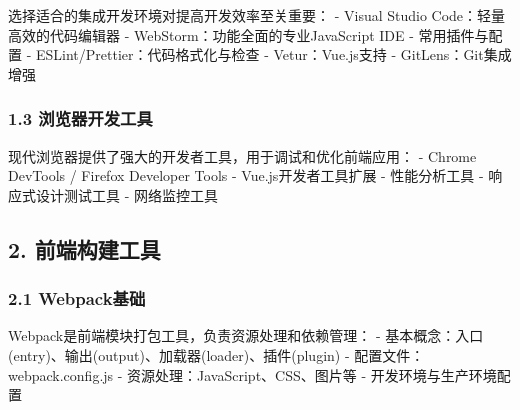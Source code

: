 选择适合的集成开发环境对提高开发效率至关重要： - Visual Studio
Code：轻量高效的代码编辑器 - WebStorm：功能全面的专业JavaScript IDE -
常用插件与配置 - ESLint/Prettier：代码格式化与检查 - Vetur：Vue.js支持 -
GitLens：Git集成增强

\subsubsection{1.3
浏览器开发工具}\label{ux6d4fux89c8ux5668ux5f00ux53d1ux5de5ux5177}

现代浏览器提供了强大的开发者工具，用于调试和优化前端应用： - Chrome
DevTools / Firefox Developer Tools - Vue.js开发者工具扩展 - 性能分析工具
- 响应式设计测试工具 - 网络监控工具

\subsection{2. 前端构建工具}\label{ux524dux7aefux6784ux5efaux5de5ux5177}

\subsubsection{2.1 Webpack基础}\label{webpackux57faux7840}

Webpack是前端模块打包工具，负责资源处理和依赖管理： -
基本概念：入口(entry)、输出(output)、加载器(loader)、插件(plugin) -
配置文件：webpack.config.js - 资源处理：JavaScript、CSS、图片等 -
开发环境与生产环境配置

